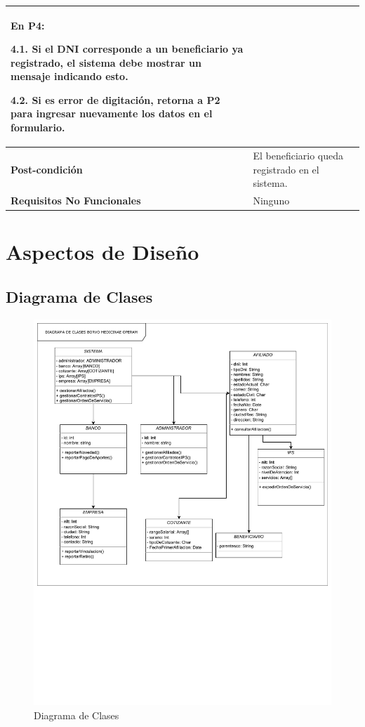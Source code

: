 \documentclass[12pt,a4paper]{article}
\begin{document}
\begin{center}
\begin{tabular}{|m{5.5cm}| m{9.5cm}|}
	En P4:
	
	4.1. Si el DNI corresponde a un beneficiario ya registrado, el sistema debe mostrar un mensaje indicando esto.
	
	4.2. Si es error de digitación, retorna a P2 para ingresar nuevamente los datos en el formulario. \\ 
\hline 
\textbf{Post-condición}  & El beneficiario queda registrado en el sistema. \\ 
\hline 
\textbf{Requisitos No Funcionales} & Ninguno \\ 
\hline 
\end{tabular}
\vspace{5mm}
\end{center}
\section{Aspectos de Diseño}
\subsection{Diagrama de Clases}
\begin{figure}[H]
\centering
{\includegraphics[width=1\textwidth]{Class_Diagram.pdf}\par}
\caption{Diagrama de Clases}
\end{figure}
\end{document}

